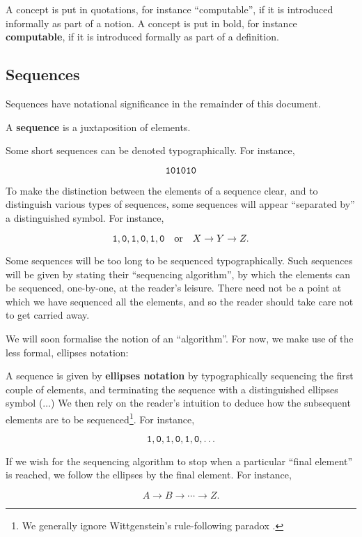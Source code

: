 A concept is put in quotations, for instance ``computable'', if it is
introduced informally as part of a notion. A concept is put in bold, for
instance \textbf{computable}, if it is introduced formally as part of a
definition.

\subsection{Sequences}

Sequences have notational significance in the remainder of this document.

\begin{notion}

A \textbf{sequence} is a juxtaposition of elements.

\end{notion}

Some short sequences can be denoted typographically. For instance,

$$\mathtt{1}\mathtt{0}\mathtt{1}\mathtt{0}\mathtt{1}\mathtt{0}$$

To make the distinction between the elements of a sequence clear, and to
distinguish various types of sequences, some sequences will appear ``separated
by'' a distinguished symbol. For instance,

$$\mathtt{1},\mathtt{0},\mathtt{1},\mathtt{0},\mathtt{1},\mathtt{0} \quad \text{or} \quad
X\rightarrow Y \rightarrow Z.$$

Some sequences will be too long to be sequenced typographically. Such sequences
will be given by stating their ``sequencing algorithm'', by which the elements can
be sequenced, one-by-one, at the reader's leisure. There need not be a point at
which we have sequenced all the elements, and so the reader should take care
not to get carried away.

We will soon formalise the notion of an ``algorithm''. For now, we make use of
the less formal, ellipses notation:

\begin{notation} A sequence is given by \textbf{ellipses notation} by
typographically sequencing the first couple of elements, and terminating the
sequence with a distinguished ellipses symbol ($\ldots$) We then rely on the
reader's intuition to deduce how the subsequent elements are to be
sequenced\footnote{We generally ignore Wittgenstein's rule-following paradox
\cite[\textsection~201, p.  69]{wittgenstein-1953}.}. For instance,

$$\mathtt{1},\mathtt{0},\mathtt{1},\mathtt{0},\mathtt{1},\mathtt{0},\ldots$$ 

If we wish for the sequencing algorithm to stop when a particular ``final
element'' is reached, we follow the ellipses by the final element. For instance,

$$A\rightarrow B \rightarrow \cdots \rightarrow Z.$$

\end{notation}

